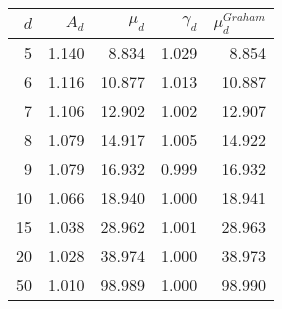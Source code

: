 \begin{tabular}{rrrrr}
\toprule
 $d$ &  $A_d$ &  $\mu_d$ &  $\gamma_d$ &  $\mu_d^{Graham}$ \\
\midrule
   5 &  1.140 &    8.834 &       1.029 &             8.854 \\
   6 &  1.116 &   10.877 &       1.013 &            10.887 \\
   7 &  1.106 &   12.902 &       1.002 &            12.907 \\
   8 &  1.079 &   14.917 &       1.005 &            14.922 \\
   9 &  1.079 &   16.932 &       0.999 &            16.932 \\
  10 &  1.066 &   18.940 &       1.000 &            18.941 \\
  15 &  1.038 &   28.962 &       1.001 &            28.963 \\
  20 &  1.028 &   38.974 &       1.000 &            38.973 \\
  50 &  1.010 &   98.989 &       1.000 &            98.990 \\
\bottomrule
\end{tabular}
